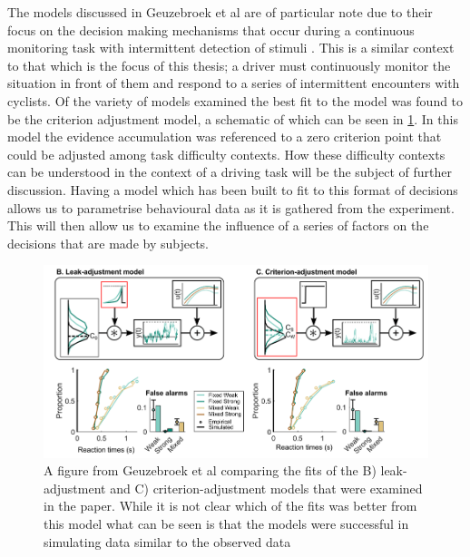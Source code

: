 The models discussed in Geuzebroek et al are of particular note due to their focus on the decision making mechanisms that occur during a continuous monitoring task with intermittent detection of stimuli \cite{geuzebroekBalancingTrueFalse2023}. This is a similar context to that which is the focus of this thesis; a driver must continuously monitor the situation in front of them and respond to a series of intermittent encounters with cyclists. Of the variety of models examined the best fit to the model was found to be the criterion adjustment model, a schematic of which can be seen in \ref{fig:Anna}. In this model the evidence accumulation was referenced to a zero criterion point that could be adjusted among task difficulty contexts. How these difficulty contexts can be understood in the context of a driving task will be the subject of further discussion.
Having a model which has been built to fit to this format of decisions allows us to parametrise behavioural data as it is gathered from the experiment. This will then allow us to examine the influence of a series of factors on the decisions that are made by subjects.
\begin{figure}
    \centering
    \includegraphics[width=0.75\linewidth]{figures/Anna.PNG}
    \caption{A figure from Geuzebroek et al comparing the fits of the B) leak-adjustment and C) criterion-adjustment models that were examined in the paper. While it is not clear which of the fits was better from this model what can be seen is that the models were successful in simulating data similar to the observed data \cite{geuzebroekBalancingTrueFalse2023}}
    \label{fig:Anna}
\end{figure}

